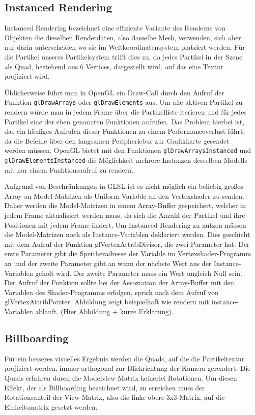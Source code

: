 \subsection{Instanced Rendering}
\label{Kapitel_2_-_Unterkapitel_1.2}
%
Instanced Rendering bezeichnet eine effiziente Variante des Renderns von Objekten die dieselben Renderdaten, also dasselbe Mesh, verwenden, sich aber nur darin unterscheiden wo sie im Weltkoordinatensystem platziert werden. Für die Partikel unseres Partikelsystem trifft dies zu, da jedes Partikel in der Szene als Quad, bestehend aus 6 Vertices, dargestellt wird, auf das eine Textur projiziert wird.

Üblicherweise führt man in OpenGL ein Draw-Call durch den Aufruf der Funktion {\texttt{glDrawArrays}} oder {\texttt{glDrawElements}} aus. Um alle aktiven Partikel zu rendern würde man in jedem Frame über die Partikelliste iterieren und für jedes Partikel eine der eben genannten Funktionen aufrufen. Das Problem hierbei ist, das ein häufiges Aufrufen dieser Funktionen zu einem Performanceverlust führt, da die Befehle über den langsamen Peripheriebus zur Grafikkarte gesendet werden müssen. OpenGL bietet mit den Funktionen {\texttt{glDrawArraysInstanced}} und {\texttt{glDrawElementsInstanced}} die Möglichkeit mehrere Instanzen desselben Modells mit nur einem Funktionsaufruf zu rendern.

Aufgrund von Beschränkungen in GLSL ist es nicht möglich ein beliebig großes Array an Model-Matrizen als Uniform-Variable an den Vertexshader zu senden. Daher werden die Model-Matrizen in einem Array-Buffer gespeichert, welcher in jedem Frame aktualisiert werden muss, da sich die Anzahl der Partikel und ihre Positionen mit jedem Frame ändert. 
Um Instanced Rendering zu nutzen müssen die Model-Matrizen noch als Instance-Variablen deklariert werden. Dies geschieht mit dem Aufruf der Funktion glVertexAttribDivisor, die zwei Parameter hat. Der erste Parameter gibt die Speicheradresse der Variable im Vertexshader-Programm an und der zweite Parameter gibt an wann der nächste Wert aus der Instance-Variablen geholt wird. Der zweite Parameter muss ein Wert ungleich Null sein.  Der Aufruf der Funktion sollte bei der Assoziation der Array-Buffer mit den Variablen des Shader-Programms erfolgen, sprich nach dem Aufruf von glVertexAttribPointer.
Abbildung zeigt beispielhaft wie rendern mit instance-Variablen abläuft.
(Hier Abbildung + kurze Erklärung).

\subsection{Billboarding}
\label{Kapitel_2_-_Unterkapitel_1.3}
%
Für ein besseres visuelles Ergebnis werden die Quads, auf die die Partikeltextur projiziert werden, immer orthogonal zur Blickrichtung der Kamera gerendert. Die Quads erfahren durch die
Modelview-Matrix keinerlei Rotationen. Um diesen Effekt, der als Billboarding bezeichnet wird, zu erreichen muss der Rotationsanteil der View-Matrix, also die linke obere 3x3-Matrix, auf die Einheitsmatrix gesetzt werden.

